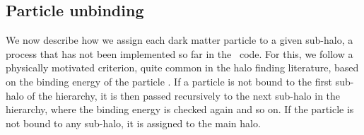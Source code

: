 \subsection{Particle unbinding}

We now describe how we assign each dark matter particle to a given
sub-halo, a process that has not been implemented so far in the
\phew\ code.  For this, we follow a physically motivated criterion,
quite common in the halo finding literature, based on the binding
energy of the particle \citep[e.g.][]{AHF, subfind, skid}.  If a
particle is not bound to the first sub-halo of the hierarchy, it is
then passed recursively to the next sub-halo in the hierarchy, where
the binding energy is checked again and so on.  If the particle is not
bound to any sub-halo, it is assigned to the main halo.

